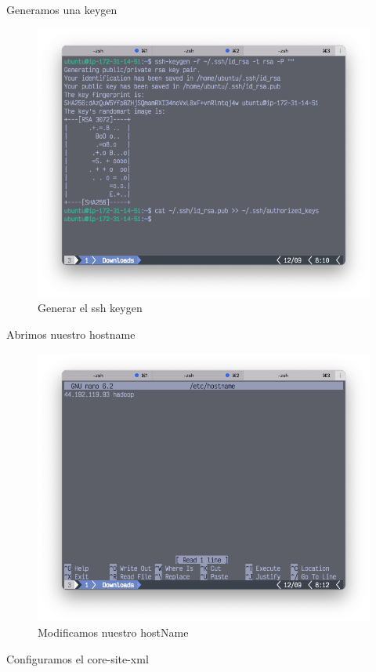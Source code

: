 Generamos una keygen
 \clearpage
\begin{figure}[h]
	\centering
	\includegraphics[scale=.35] {img/33-ssh-keygen}
	\caption{Generar el ssh keygen}
	\label{fig:33}	
\end{figure}


Abrimos nuestro hostname


\begin{figure}[h]
	\centering
	\includegraphics[scale=.35] {img/34-nano-etc-hostname}
	\caption{Modificamos nuestro hostName}
	\label{fig:34}	
\end{figure}
Configuramos el core-site-xml

